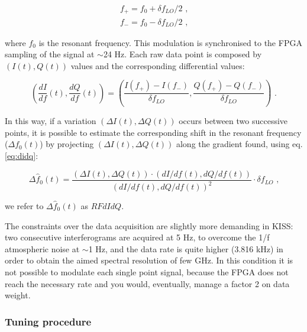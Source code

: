 \documentclass[twocolumn,traditabstract]{aa}\\
\begin{document}
\begin{equation}
\begin{align}
f_+ = f_0 + \delta f_{LO}/2 \text{ ,}
\\
f_- = f_0 - \delta f_{LO}/2 \text{ ,}
\end{align}
\end{equation}

\noindent where $f_0$ is the resonant frequency. This modulation is synchronised to the FPGA sampling of the signal at $\sim$24 Hz. Each raw data point is composed by $(I(t), Q(t))$ values and the corresponding differential values:

\begin{equation}
\left( \frac{dI}{df}(t),\frac{dQ}{df}(t) \right) = \left( \frac{I(f_+)-I(f_-)}{\delta f_{LO}}, \frac{Q(f_+)-Q(f_-)}{\delta f_{LO}} \right) \text{ .}
\label{eq:didq}
\end{equation}

\noindent In this way, if a variation $(\Delta I(t), \Delta Q(t))$ occurs between two successive points, it is possible to estimate the corresponding shift in the resonant frequency ($\Delta f_0(t)$) by projecting
$(\Delta I(t), \Delta Q(t))$ along the gradient found, using 
eq. \ref{eq:didq}:

\begin{equation}
\Delta \hat{f}_0 (t) = \frac{(\Delta I(t), \Delta Q(t))\cdot (dI/df(t),dQ/df(t)  ) }{ ( dI/df(t), dQ/df(t) )^2 }\cdot\delta f_{LO} \text{ ,}
\end{equation}

\noindent we refer to $\Delta \hat{f}_0 (t)$ as $RFdIdQ$.

The constraints over the data acquisition are slightly more demanding in KISS: two consecutive interferograms are acquired at 5 Hz, to overcome the 1/f atmospheric noise at $\sim$1 Hz, and the data rate is quite higher (3.816 kHz) in order to obtain the aimed spectral resolution of few GHz. In this condition it is not possible to modulate each single point signal, because the FPGA does not reach the necessary rate and you would, eventually, manage a factor 2 on data weight.

\subsubsection{Tuning procedure}
\label{sec:tuning}
\end{document}
